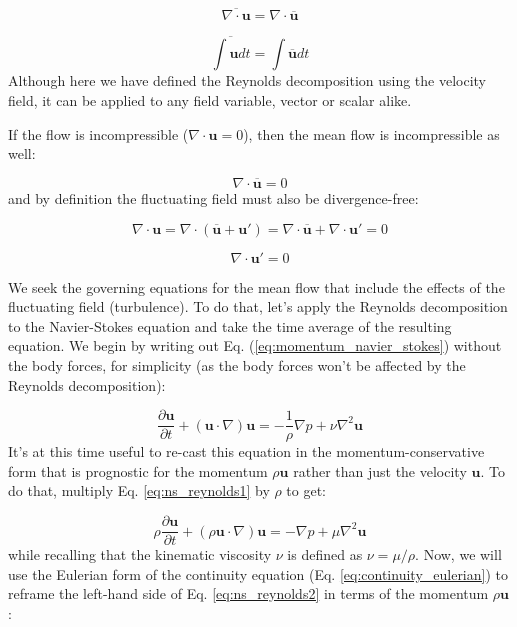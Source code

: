 \documentclass[12pt]{article}
\numberwithin{equation}{section}
\numberwithin{figure}{section}
\numberwithin{table}{section}
\begin{document}
\begin{equation}
  \overline{\nabla \cdot \mathbf{u}} = \nabla \cdot \overline{\mathbf{u}}
\end{equation}

\begin{equation}
  \overline{\int \mathbf{u} dt} = \int \overline{\mathbf{u}} dt
\end{equation}
Although here we have defined the Reynolds decomposition using the velocity
field, it can be applied to any field variable, vector or scalar alike.

If the flow is incompressible ($\nabla \cdot \mathbf{u} = 0$), then the mean
flow is incompressible as well:

\begin{equation}
  \nabla \cdot \overline{\mathbf{u}} = 0
\end{equation}
and by definition the fluctuating field must also be divergence-free:

\begin{equation}
  \nabla \cdot \mathbf{u} = \nabla \cdot (\overline{\mathbf{u}} + \mathbf{u}') =
  \nabla \cdot \overline{\mathbf{u}} + \nabla \cdot \mathbf{u}' = 0
\end{equation}

\begin{equation}
  \nabla \cdot \mathbf{u}' = 0
\end{equation}

We seek the governing equations for the mean flow that include the effects of
the fluctuating field (turbulence).
To do that, let's apply the Reynolds decomposition to the Navier-Stokes equation
and take the time average of the resulting equation.
We begin by writing out Eq. (\ref{eq:momentum_navier_stokes}) without the
body forces, for simplicity (as the body forces won't be affected by the
Reynolds decomposition):

\begin{equation}
  \frac{\partial \mathbf{u}}{\partial t} + (\mathbf{u} \cdot \nabla) \mathbf{u} =
  - \frac{1}{\rho} \nabla p + \nu \nabla^2 \mathbf{u}
  \label{eq:ns_reynolds1}
\end{equation}
It's at this time useful to re-cast this equation in the momentum-conservative
form that is prognostic for the momentum $\rho \mathbf{u}$ rather than just the
velocity $\mathbf{u}$.
To do that, multiply Eq. \ref{eq:ns_reynolds1} by $\rho$ to get:

\begin{equation}
  \rho \frac{\partial \mathbf{u}}{\partial t} + (\rho \mathbf{u} \cdot \nabla) \mathbf{u} =
  - \nabla p + \mu \nabla^2 \mathbf{u}
  \label{eq:ns_reynolds2}
\end{equation}
while recalling that the kinematic viscosity $\nu$ is defined as
$\nu = \mu / \rho$.
Now, we will use the Eulerian form of the continuity equation
(Eq. \ref{eq:continuity_eulerian}) to reframe the left-hand side of Eq.
\ref{eq:ns_reynolds2} in terms of the momentum $\rho \mathbf{u}$:
\end{document}
